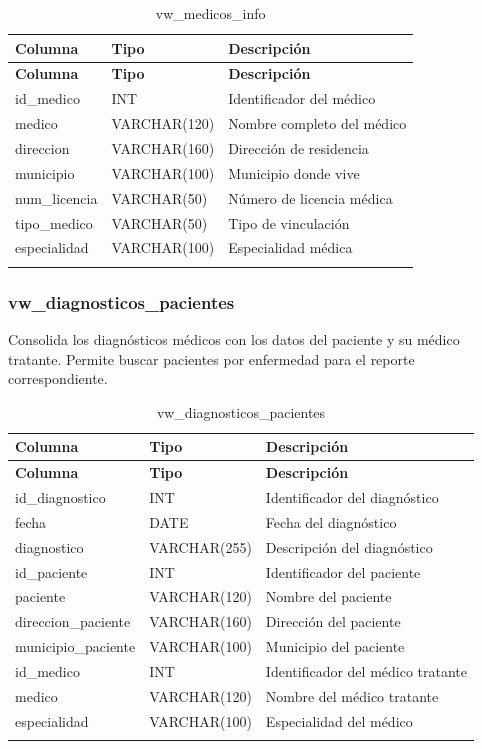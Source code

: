 \documentclass[12pt,a4paper]{article}
\begin{document}
{\small\begin{longtable}{|p{2.3cm}|p{3.3cm}|p{8cm}|}
\hline
\textbf{Columna} & \textbf{Tipo} & \textbf{Descripci\'on} \\ \hline
\endfirsthead
\hline
\textbf{Columna} & \textbf{Tipo} & \textbf{Descripci\'on} \\ \hline
\endhead
id\_medico & INT & Identificador del m\'edico \\ \hline
medico & VARCHAR(120) & Nombre completo del m\'edico \\ \hline
direccion & VARCHAR(160) & Direcci\'on de residencia \\ \hline
municipio & VARCHAR(100) & Municipio donde vive \\ \hline
num\_licencia & VARCHAR(50) & N\'umero de licencia m\'edica \\ \hline
tipo\_medico & VARCHAR(50) & Tipo de vinculaci\'on \\ \hline
especialidad & VARCHAR(100) & Especialidad m\'edica \\ \hline
\caption{vw\_medicos\_info}
\end{longtable}}

\subsubsection{vw\_diagnosticos\_pacientes}
Consolida los diagn\'osticos m\'edicos con los datos del paciente y su m\'edico tratante. Permite buscar pacientes por enfermedad para el reporte correspondiente.

{\small\begin{longtable}{|p{2.3cm}|p{3.3cm}|p{8cm}|}
\hline
\textbf{Columna} & \textbf{Tipo} & \textbf{Descripci\'on} \\ \hline
\endfirsthead
\hline
\textbf{Columna} & \textbf{Tipo} & \textbf{Descripci\'on} \\ \hline
\endhead
id\_diagnostico & INT & Identificador del diagn\'ostico \\ \hline
fecha & DATE & Fecha del diagn\'ostico \\ \hline
diagnostico & VARCHAR(255) & Descripci\'on del diagn\'ostico \\ \hline
id\_paciente & INT & Identificador del paciente \\ \hline
paciente & VARCHAR(120) & Nombre del paciente \\ \hline
direccion\_paciente & VARCHAR(160) & Direcci\'on del paciente \\ \hline
municipio\_paciente & VARCHAR(100) & Municipio del paciente \\ \hline
id\_medico & INT & Identificador del m\'edico tratante \\ \hline
medico & VARCHAR(120) & Nombre del m\'edico tratante \\ \hline
especialidad & VARCHAR(100) & Especialidad del m\'edico \\ \hline
\caption{vw\_diagnosticos\_pacientes}
\end{longtable}}
\end{document}
